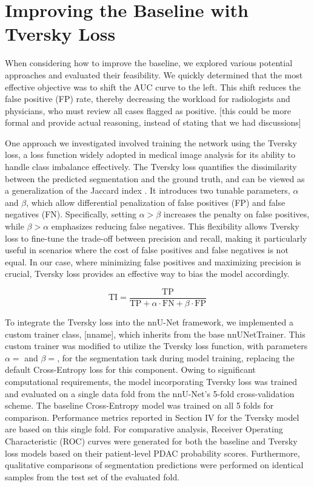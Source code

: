 \documentclass[conference]{IEEEtran}
\begin{document}
\section{Improving the Baseline with Tversky Loss}

When considering how to improve the baseline, we explored various potential approaches and evaluated their feasibility. We quickly determined that the most effective objective was to shift the AUC curve to the left. This shift reduces the false positive (FP) rate, thereby decreasing the workload for radiologists and physicians, who must review all cases flagged as positive. [this could be more formal and provide actual reasoning, instead of stating that we had discussions]

One approach we investigated involved training the network using the Tversky loss, a loss function widely adopted in medical image analysis for its ability to handle class imbalance effectively. The Tversky loss quantifies the dissimilarity between the predicted segmentation and the ground truth, and can be viewed as a generalization of the Jaccard index \cite{b3}. It introduces two tunable parameters, $\alpha$ and $\beta$, which allow differential penalization of false positives (FP) and false negatives (FN). Specifically, setting $\alpha > \beta$ increases the penalty on false positives, while $\beta > \alpha$ emphasizes reducing false negatives. This flexibility allows Tversky loss to fine-tune the trade-off between precision and recall, making it particularly useful in scenarios where the cost of false positives and false negatives is not equal. In our case, where minimizing false positives and maximizing precision is crucial, Tversky loss provides an effective way to bias the model accordingly.

\[
\text{TI} = \frac{\text{TP}}{\text{TP} + \alpha \cdot \text{FN} + \beta \cdot \text{FP}}
\]

To integrate the Tversky loss into the nnU-Net framework, we implemented a custom trainer class, [nname], which inherits from the base nnUNetTrainer. This custom trainer was modified to utilize the Tversky loss function, with parameters $\alpha=$ and $\beta=$, for the segmentation task during model training, replacing the default Cross-Entropy loss for this component. Owing to significant computational requirements, the model incorporating Tversky loss was trained and evaluated on a single data fold from the nnU-Net's 5-fold cross-validation scheme. The baseline Cross-Entropy model was trained on all 5 folds for comparison. Performance metrics reported in Section IV for the Tversky model are based on this single fold. For comparative analysis, Receiver Operating Characteristic (ROC) curves were generated for both the baseline and Tversky loss models based on their patient-level PDAC probability scores. Furthermore, qualitative comparisons of segmentation predictions were performed on identical samples from the test set of the evaluated fold.
\end{document}
